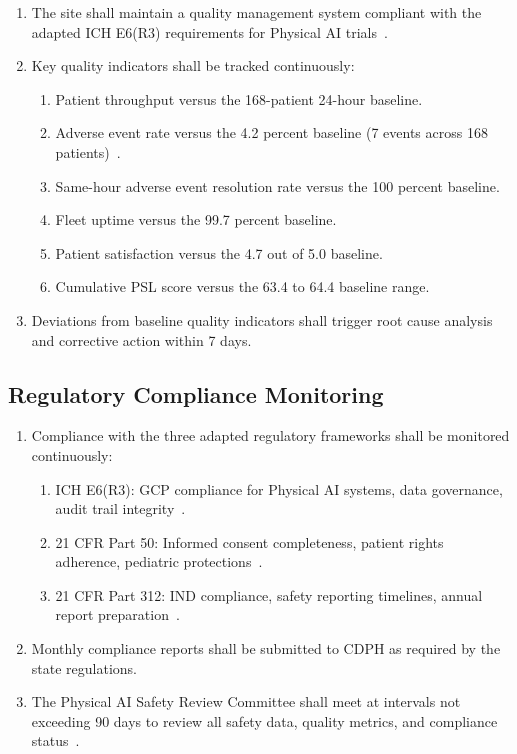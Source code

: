 \documentclass[11pt,letterpaper]{article}
\begin{document}
\begin{enumerate}[label=(\alph*)]
\item The site shall maintain a quality management system compliant with the
  adapted ICH E6(R3) requirements for Physical AI
  trials~\cite{iche6r3adapt}.

\item Key quality indicators shall be tracked continuously:
  \begin{enumerate}[label=(\arabic*)]
  \item Patient throughput versus the 168-patient 24-hour baseline.
  \item Adverse event rate versus the 4.2 percent baseline (7 events across
    168 patients)~\cite{newtrial2026}.
  \item Same-hour adverse event resolution rate versus the 100 percent
    baseline.
  \item Fleet uptime versus the 99.7 percent baseline.
  \item Patient satisfaction versus the 4.7 out of 5.0 baseline.
  \item Cumulative PSL score versus the 63.4 to 64.4 baseline range.
  \end{enumerate}

\item Deviations from baseline quality indicators shall trigger root cause
  analysis and corrective action within 7 days.
\end{enumerate}

\subsection{Regulatory Compliance Monitoring}

\begin{enumerate}[label=(\alph*)]
\item Compliance with the three adapted regulatory frameworks shall be
  monitored continuously:
  \begin{enumerate}[label=(\arabic*)]
  \item ICH E6(R3): GCP compliance for Physical AI systems, data governance,
    audit trail integrity~\cite{iche6r3adapt}.
  \item 21 CFR Part 50: Informed consent completeness, patient rights
    adherence, pediatric protections~\cite{cfr50adapt}.
  \item 21 CFR Part 312: IND compliance, safety reporting timelines, annual
    report preparation~\cite{cfr312adapt}.
  \end{enumerate}

\item Monthly compliance reports shall be submitted to CDPH as required by
  the state regulations.

\item The Physical AI Safety Review Committee shall meet at intervals not
  exceeding 90 days to review all safety data, quality metrics, and
  compliance status~\cite{cfr312adapt}.
\end{enumerate}
\end{document}
